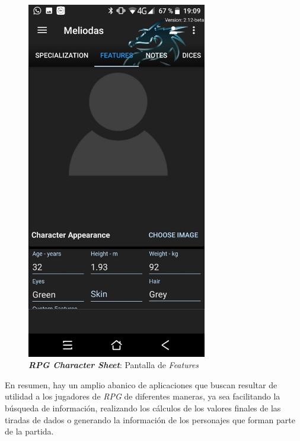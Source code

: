 \begin{figure}[H]
\begin{minipage}{0.3\textwidth}
    \end{minipage} \hspace{2cm}
    \begin{minipage}{0.3\textwidth}
        \centering
        \includegraphics[width=0.7\textwidth]{Images/RPG_Character_Sheet_2.jpeg}
        \caption{\textit{\textbf{RPG Character Sheet}}: Pantalla de 
        \textit{Features}}
    \end{minipage}
\end{figure}
\vspace{1cm}

En resumen, hay un amplio abanico de aplicaciones que buscan resultar de utilidad a los 
jugadores de \textit{RPG} de diferentes maneras, ya sea facilitando la búsqueda de información, 
realizando los cálculos de los valores finales de las tiradas de dados o generando la información
de los personajes que forman parte de la partida.